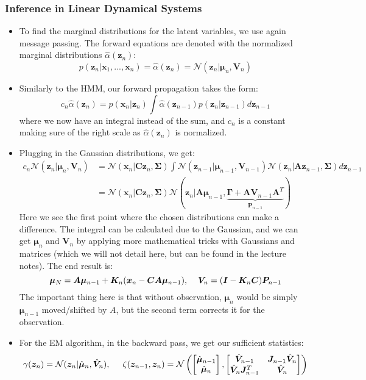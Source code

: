\subsubsection{Inference in Linear Dynamical Systems}
\begin{itemize}
	\item To find the marginal distributions for the latent variables, we use again message passing. The forward equations are denoted with the normalized marginal distributions $\widehat{\alpha}(\bm{z}_n)$:
	$$p(\bm{z}_n|\bm{x}_1,...,\bm{x}_n) = \widehat{\alpha}(\bm{z}_n) = \mathcal{N}(\bm{z}_n|\bm{\mu}_{n}, \bm{V}_n)$$
	\item Similarly to the HMM, our forward propagation takes the form:
	$$c_n \widehat{\alpha}(\bm{z}_n) = p(\bm{x}_n|\bm{z}_n) \int \widehat{\alpha}(\bm{z}_{n-1})p(\bm{z}_n|\bm{z}_{n-1})d\bm{z}_{n-1}$$
	where we now have an integral instead of the sum, and $c_n$ is a constant making sure of the right scale as $\widehat{\alpha}(\bm{z}_n)$ is normalized.
	\item Plugging in the Gaussian distributions, we get:
	\begin{equation*}
		\begin{split}
			c_n \mathcal{N}(\bm{z}_n|\bm{\mu}_n, \bm{V}_n) &  = \mathcal{N}(\bm{x}_n|\bm{C}\bm{z}_n, \bm{\Sigma})\int \mathcal{N}(\bm{z}_{n-1}|\bm{\mu}_{n-1}, \bm{V}_{n-1})\mathcal{N}(\bm{z}_n|\bm{A}\bm{z}_{n-1}, \bm{\Sigma})d\bm{z}_{n-1}\\
			& = \mathcal{N}(\bm{x}_n|\bm{C}\bm{z}_n, \bm{\Sigma}) \mathcal{N}(\bm{z}_n|\bm{A}\bm{\mu}_{n-1}, \underbrace{\bm{\Gamma}+\bm{A}\bm{V}_{n-1}\bm{A}^T}_{\bm{P}_{n-1}})
		\end{split}
	\end{equation*}
	Here we see the first point where the chosen distributions can make a difference. The integral can be calculated due to the Gaussian, and we can get $\bm{\mu}_n$ and $\bm{V}_n$ by applying more mathematical tricks with Gaussians and matrices (which we will not detail here, but can be found in the lecture notes). The end result is:
	$$\bm{\mu}_N = \bm{A}\bm{\mu}_{n-1} + \bm{K}_n (\bm{x}_n - \bm{C}\bm{A}\bm{\mu}_{n-1}), \hspace{4mm} \bm{V}_n=(\bm{I} - \bm{K}_n\bm{C})\bm{P}_{n-1}$$
	The important thing here is that without observation, $\bm{\mu}_n$ would be simply $\bm{\mu}_{n-1}$ moved/shifted by $A$, but the second term corrects it for the observation.
	\item For the EM algorithm, in the backward pass, we get our sufficient statistics:
	$$\gamma(\bm{z}_n)=\mathcal{N}(\bm{z}_n|\hat{\bm{\mu}}_n, \hat{\bm{V}}_n),\hspace{5mm}\zeta(\bm{z}_{n-1},\bm{z}_n)=\mathcal{N}\left(\begin{bmatrix}
	\hat{\bm{\mu}}_{n-1} \\ \hat{\bm{\mu}}_{n}
	\end{bmatrix}, \begin{bmatrix}
	\hat{\bm{V}}_{n-1} & \bm{J}_{n-1}\hat{\bm{V}}_{n}\\ \hat{\bm{V}}_{n}\bm{J}_{n-1}^T& \hat{\bm{V}}_{n}
	\end{bmatrix}\right)$$
\end{itemize}
